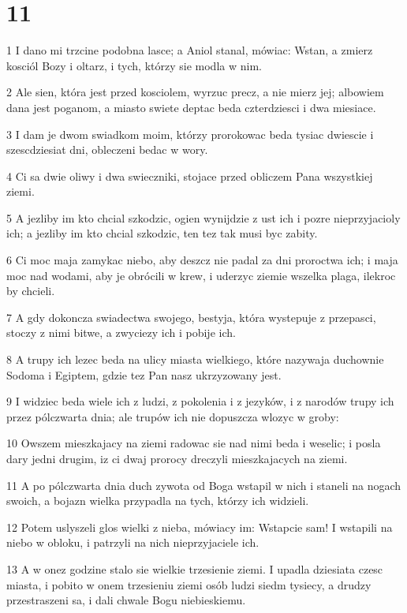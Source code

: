 \chapter{11}

\par 1 I dano mi trzcine podobna lasce; a Aniol stanal, mówiac: Wstan, a zmierz kosciól Bozy i oltarz, i tych, którzy sie modla w nim.
\par 2 Ale sien, która jest przed kosciolem, wyrzuc precz, a nie mierz jej; albowiem dana jest poganom, a miasto swiete deptac beda czterdziesci i dwa miesiace.
\par 3 I dam je dwom swiadkom moim, którzy prorokowac beda tysiac dwiescie i szescdziesiat dni, obleczeni bedac w wory.
\par 4 Ci sa dwie oliwy i dwa swieczniki, stojace przed obliczem Pana wszystkiej ziemi.
\par 5 A jezliby im kto chcial szkodzic, ogien wynijdzie z ust ich i pozre nieprzyjacioly ich; a jezliby im kto chcial szkodzic, ten tez tak musi byc zabity.
\par 6 Ci moc maja zamykac niebo, aby deszcz nie padal za dni proroctwa ich; i maja moc nad wodami, aby je obrócili w krew, i uderzyc ziemie wszelka plaga, ilekroc by chcieli.
\par 7 A gdy dokoncza swiadectwa swojego, bestyja, która wystepuje z przepasci, stoczy z nimi bitwe, a zwyciezy ich i pobije ich.
\par 8 A trupy ich lezec beda na ulicy miasta wielkiego, które nazywaja duchownie Sodoma i Egiptem, gdzie tez Pan nasz ukrzyzowany jest.
\par 9 I widziec beda wiele ich z ludzi, z pokolenia i z jezyków, i z narodów trupy ich przez pólczwarta dnia; ale trupów ich nie dopuszcza wlozyc w groby:
\par 10 Owszem mieszkajacy na ziemi radowac sie nad nimi beda i weselic; i posla dary jedni drugim, iz ci dwaj prorocy dreczyli mieszkajacych na ziemi.
\par 11 A po pólczwarta dnia duch zywota od Boga wstapil w nich i staneli na nogach swoich, a bojazn wielka przypadla na tych, którzy ich widzieli.
\par 12 Potem uslyszeli glos wielki z nieba, mówiacy im: Wstapcie sam! I wstapili na niebo w obloku, i patrzyli na nich nieprzyjaciele ich.
\par 13 A w onez godzine stalo sie wielkie trzesienie ziemi. I upadla dziesiata czesc miasta, i pobito w onem trzesieniu ziemi osób ludzi siedm tysiecy, a drudzy przestraszeni sa, i dali chwale Bogu niebieskiemu.
